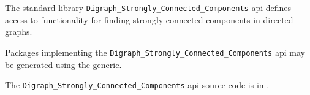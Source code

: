 
The standard library {\tt Digraph\_Strongly\_Connected\_Components} api defines access to functionality 
for finding strongly connected components in directed graphs.

Packages implementing the {\tt Digraph\_Strongly\_Connected\_Components} api may be generated 
using the  generic.

The {\tt Digraph\_Strongly\_Connected\_Components} api source code is in .





